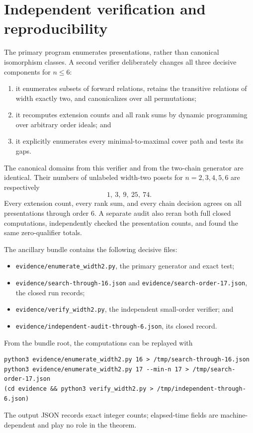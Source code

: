 \documentclass[11pt]{article}
\theoremstyle{definition}
\begin{document}
\section{Independent verification and reproducibility}\label{sec:verification}

The primary program enumerates presentations, rather than canonical
isomorphism classes.  A second verifier deliberately changes all three
decisive components for $n\leq6$:
\begin{enumerate}
\item it enumerates subsets of forward relations, retains the transitive
relations of width exactly two, and canonicalizes over all permutations;
\item it recomputes extension counts and all rank sums by dynamic programming
over arbitrary order ideals; and
\item it explicitly enumerates every minimal-to-maximal cover path and tests
its gaps.
\end{enumerate}
The canonical domains from this verifier and from the two-chain generator are
identical.  Their numbers of unlabeled width-two posets for
$n=2,3,4,5,6$ are respectively
\[
  1,\ 3,\ 9,\ 25,\ 74.
\]
Every extension count, every rank sum, and every chain decision agrees on all
presentations through order $6$.  A separate audit also reran both full closed
computations, independently checked the presentation counts, and found the
same zero-qualifier totals.

The ancillary bundle contains the following decisive files:
\begin{itemize}
\item \texttt{evidence/enumerate\_width2.py}, the primary generator and exact
test;
\item \texttt{evidence/search-through-16.json} and
\texttt{evidence/search-order-17.json}, the closed run records;
\item \texttt{evidence/verify\_width2.py}, the independent small-order
verifier; and
\item \texttt{evidence/independent-audit-through-6.json}, its closed record.
\end{itemize}
From the bundle root, the computations can be replayed with
\begin{verbatim}
python3 evidence/enumerate_width2.py 16 > /tmp/search-through-16.json
python3 evidence/enumerate_width2.py 17 --min-n 17 > /tmp/search-order-17.json
(cd evidence && python3 verify_width2.py > /tmp/independent-through-6.json)
\end{verbatim}
The output JSON records exact integer counts; elapsed-time fields are
machine-dependent and play no role in the theorem.
\end{document}
